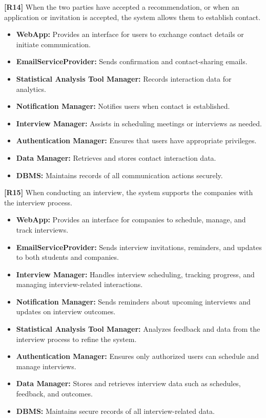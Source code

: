 \textbf{[R14]} When the two parties have accepted a recommendation, or when an application or invitation is accepted, the system allows them to establish contact.
\begin{itemize}
    \item \textbf{WebApp:} Provides an interface for users to exchange contact details or initiate communication.
    \item \textbf{EmailServiceProvider:} Sends confirmation and contact-sharing emails.
    \item \textbf{Statistical Analysis Tool Manager:} Records interaction data for analytics.
    \item \textbf{Notification Manager:} Notifies users when contact is established.
    \item \textbf{Interview Manager:} Assists in scheduling meetings or interviews as needed.
    \item \textbf{Authentication Manager:} Ensures that users have appropriate privileges.
    \item \textbf{Data Manager:} Retrieves and stores contact interaction data.
    \item \textbf{DBMS:} Maintains records of all communication actions securely.
\end{itemize}

\textbf{[R15]} When conducting an interview, the system supports the companies with the interview process.  
\begin{itemize}
    \item \textbf{WebApp:} Provides an interface for companies to schedule, manage, and track interviews.  
    \item \textbf{EmailServiceProvider:} Sends interview invitations, reminders, and updates to both students and companies.  
    \item \textbf{Interview Manager:} Handles interview scheduling, tracking progress, and managing interview-related interactions.  
    \item \textbf{Notification Manager:} Sends reminders about upcoming interviews and updates on interview outcomes.  
    \item \textbf{Statistical Analysis Tool Manager:} Analyzes feedback and data from the interview process to refine the system.  
    \item \textbf{Authentication Manager:} Ensures only authorized users can schedule and manage interviews.  
    \item \textbf{Data Manager:} Stores and retrieves interview data such as schedules, feedback, and outcomes.  
    \item \textbf{DBMS:} Maintains secure records of all interview-related data.  
\end{itemize}  

